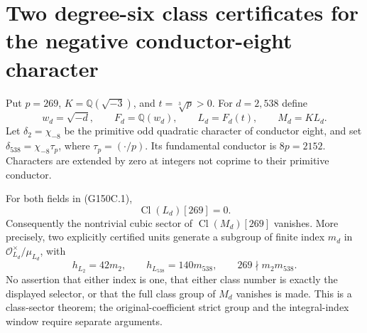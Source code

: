 \section{Two degree-six class certificates for the negative conductor-eight character}
\label{sec:negative-quadratic8-class-certificates}

Put $p=269$, $K=\mathbb Q(\sqrt{-3})$, and $t=\sqrt[3]p>0$.
For $d=2,538$ define
\[
 w_d=\sqrt{-d},\qquad F_d=\mathbb Q(w_d),\qquad
 L_d=F_d(t),\qquad M_d=KL_d.
 \tag{G150C.1}
\]
Let $\delta_2=\chi_{-8}$ be the primitive odd quadratic character
of conductor eight, and set $\delta_{538}=\chi_{-8}\tau_p$,
where $\tau_p=(\cdot/p)$.
Its fundamental conductor is $8p=2152$.
Characters are extended by zero at integers not coprime to their
primitive conductor.

\begin{theorem}
\label{AC-G150-class}
For both fields in (G150C.1),
\[
                      \operatorname{Cl}(L_d)[269]=0.
 \tag{G150C.2}
\]
Consequently the nontrivial cubic sector of
$\operatorname{Cl}(M_d)[269]$ vanishes.
More precisely, two explicitly certified units generate a subgroup
of finite index $m_d$ in $\mathcal O_{L_d}^{\times}/\mu_{L_d}$,
with
\[
 h_{L_2}=42m_2,\qquad h_{L_{538}}=140m_{538},\qquad
 269\nmid m_2m_{538}.
 \tag{G150C.3}
\]
No assertion that either index is one, that either class number is
exactly the displayed selector, or that the full class group of
$M_d$ vanishes is made.
This is a class-sector theorem; the original-coefficient strict
group and the integral-index window require separate arguments.
\end{theorem}

